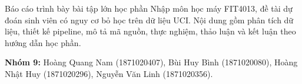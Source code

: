 Báo cáo trình bày bài tập lớn học phần Nhập môn học máy FIT4013, đề tài dự đoán sinh viên có nguy cơ bỏ học trên dữ liệu UCI. Nội dung gồm phân tích dữ liệu, thiết kế pipeline, mô tả mã nguồn, thực nghiệm, thảo luận và kết luận theo hướng dẫn học phần.

\textbf{Nhóm 9:} Hoàng Quang Nam (1871020407), Bùi Huy Bình (1871020080), Hoàng Nhật Huy (1871020296), Nguyễn Văn Linh (1871020356).
